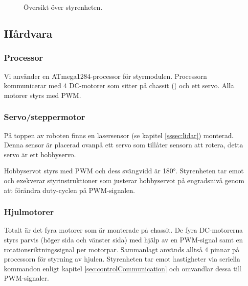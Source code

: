 \documentclass[a4paper,11pt]{article}
\begin{document}
\begin{figure}[h!]
    \caption{Översikt över styrenheten.}
    \label{fig:unitMotorcontroller}
\end{figure}

\subsection{Hårdvara}

\subsubsection{Processor}
Vi använder en ATmega1284-processor för styrmodulen. Processorn kommunicerar med 4 DC-motorer som sitter på chassit (\cite{terminator}) och ett servo. Alla motorer styrs med PWM.

\subsubsection{Servo/steppermotor} 
\label{ssec:servomotor}
På toppen av roboten finns en lasersensor (se kapitel \ref{sssec:lidar}) monterad. Denna sensor är placerad ovanpå ett servo som tillåter sensorn att rotera, detta servo är ett hobbyservo.

Hobbyservot styrs med PWM och dess svängvidd är 180\si{\degree}. Styrenheten tar emot och exekverar styrinstruktioner som justerar hobbyservot på engradsnivå genom att förändra duty-cyclen på PWM-signalen.

\subsubsection{Hjulmotorer}
Totalt är det fyra motorer som är monterade på chassit. De fyra DC-motorerna styrs parvis (höger sida och vänster sida) med hjälp av en PWM-signal samt en rotationsriktningssignal per motorpar. Sammanlagt används alltså 4 pinnar på processorn för styrning av hjulen. Styrenheten tar emot hastigheter via seriella kommandon enligt kapitel \ref{sec:controlCommunication} och omvandlar dessa till PWM-signaler.
\end{document}
